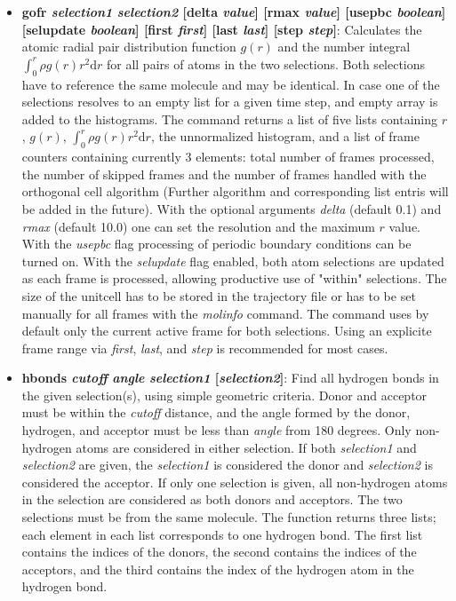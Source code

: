 \begin{itemize}
\item {\bf gofr {\it selection1} {\it selection2} [delta {\it value}] [rmax {\it value}] [usepbc {\it boolean}] [selupdate {\it boolean}] [first {\it first}] [last {\it last}] [step {\it step}]}:
 Calculates the atomic radial pair distribution function $g(r)$ and the
 number integral $\int_0^r \rho g(r) r^2\mathrm{d}r$ for all pairs of 
 atoms in the two selections. Both selections have to reference the
 same molecule and may be identical. In case one of the selections
 resolves to an empty list for a given time step, and empty array is
 added to the histograms. The command returns a list of five
 lists containing $r$, $g(r)$, $\int_0^r \rho g(r) r^2\mathrm{d}r$, 
 the unnormalized histogram, and a list of frame counters containing
 currently 3 elements: total number of frames processed, the number
 of skipped frames and the number of frames handled with the orthogonal
 cell algorithm (Further algorithm and corresponding list entris will
 be added in the future).
 With the optional arguments {\it delta} (default 0.1) and {\it rmax} 
 (default 10.0) one can set the resolution and the maximum $r$ value.
 With the {\it usepbc} flag processing of periodic boundary conditions 
 can be turned on.  With the {\it selupdate} flag enabled, both atom 
 selections are updated as each frame is processed, allowing productive
 use of "within" selections.  The size of the unitcell has to be stored in 
 the trajectory file or has to be set manually for all frames with the 
 {\it molinfo} command. The command uses by default only the current
 active frame for both selections. Using an explicite frame range via
 {\it first}, {\it last}, and {\it step} is recommended for most cases.

\item {\bf hbonds {\it cutoff} {\it angle} {\it selection1} [{\it selection2}]}:
  Find all hydrogen bonds in the given selection(s),
  using simple geometric criteria.  Donor and acceptor must be within the
  {\it cutoff} distance, and the angle formed by the donor, hydrogen, and
  acceptor must be less than {\it angle} from 180 degrees.  Only non-hydrogen
  atoms are considered in either selection.  If both 
  {\it selection1} and {\it selection2} are given, the {\it selection1} is
  considered the donor and {\it selection2} is considered the acceptor.  If
  only one selection is given, all non-hydrogen atoms in the selection are 
  considered as both donors and acceptors.  The two selections
  must be from the same molecule.  The function returns three lists; each 
  element in each list corresponds to one hydrogen bond.  The first
  list contains the indices of the donors, the second contains the indices of
  the acceptors, and the third contains the index of the hydrogen atom in
  the hydrogen bond.


\end{itemize}
